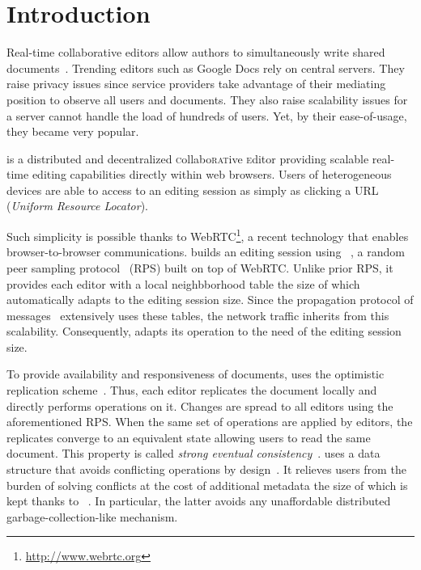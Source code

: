 
\section{Introduction}
\label{sec:introduction}

Real-time collaborative editors allow authors to simultaneously write shared
documents~\cite{greenberg1994real}. Trending editors such as Google Docs rely on
central servers. They raise privacy issues since service providers take
advantage of their mediating position to observe all users and documents. They
also raise scalability issues for a server cannot handle the load of hundreds of
users. Yet, by their ease-of-usage, they became very popular.


\CRATE is a distributed and decentralized \textsc{c}ollabo\textsc{rat}ive
\textsc{e}ditor providing scalable real-time editing capabilities directly
within web browsers. Users of heterogeneous devices are able to access to an
editing session as simply as clicking a URL (\emph{Uniform Resource Locator}).

Such simplicity is possible thanks to
WebRTC\footnote{\url{http://www.webrtc.org}}, a recent technology that enables
browser-to-browser communications. \CRATE builds an editing session using
\SPRAY~\cite{nedelec2015spray}, a random peer sampling
protocol~\cite{jelasity2007gossip} (RPS) built on top of WebRTC. Unlike prior
RPS, it provides each editor with a local neighbborhood table the size of which
automatically adapts to the editing session size. Since the propagation protocol
of messages~\cite{birman1999bimodal} extensively uses these tables, the network
traffic inherits from this scalability. Consequently, \CRATE adapts its
operation to the need of the editing session size.

To provide availability and responsiveness of documents, \CRATE uses the
optimistic replication scheme~\cite{saito2005optimistic}. Thus, each editor
replicates the document locally and directly performs operations on it. Changes
are spread to all editors using the aforementioned RPS. When the same set of
operations are applied by editors, the replicates converge to an equivalent
state allowing users to read the same document.  This property is called
\emph{strong eventual consistency}~\cite{bailis2013eventual}.  \CRATE uses a
data structure that avoids conflicting operations by
design~\cite{shapiro2011comprehensive}. It relieves users from the burden of
solving conflicts at the cost of additional metadata the size of which is kept
 thanks to \LSEQ~\cite{nedelec2013lseq}. In particular, the
latter avoids any unaffordable distributed garbage-collection-like mechanism.

